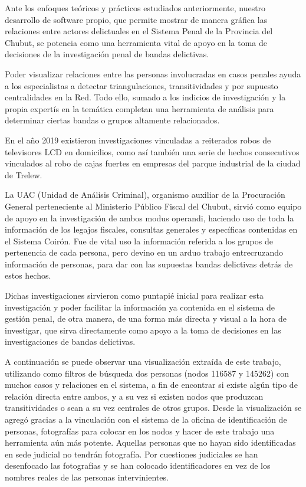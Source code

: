 Ante los enfoques teóricos y prácticos estudiados anteriormente, nuestro desarrollo de software propio, que permite mostrar de manera gráfica las relaciones entre actores delictuales en el Sistema Penal de la Provincia del Chubut, se potencia como una herramienta vital de apoyo en la toma de decisiones de la investigación penal de bandas delictivas.

Poder visualizar relaciones entre las personas involucradas en casos penales ayuda a los especialistas a detectar triangulaciones, transitividades y por supuesto centralidades en la Red. Todo ello, sumado a los indicios de investigación y la propia expertís en la temática completan una herramienta de análisis para determinar ciertas bandas o grupos altamente relacionados.

En el año 2019 existieron investigaciones vinculadas a reiterados robos de televisores LCD en domicilios, como así también una serie de hechos consecutivos vinculados al robo de cajas fuertes en empresas del parque industrial de la ciudad de Trelew.

La UAC (Unidad de Análisis Criminal), organismo auxiliar de la Procuración General perteneciente al Ministerio Público Fiscal del Chubut, sirvió como equipo de apoyo en la investigación de ambos modus operandi, haciendo uso de toda la información de los legajos fiscales, consultas generales y específicas contenidas en el Sistema Coirón. Fue de vital uso la información referida a los grupos de pertenencia de cada persona, pero devino en un arduo trabajo entrecruzando información de personas, para dar con las supuestas bandas delictivas detrás de estos hechos.

Dichas investigaciones sirvieron como puntapié inicial para realizar esta investigación y poder facilitar la información ya contenida en el sistema de gestión penal, de otra manera, de una forma más directa y visual a la hora de investigar, que sirva directamente como apoyo a la toma de decisiones en las investigaciones de bandas delictivas. 

A continuación se puede observar una visualización extraída de este trabajo, utilizando como filtros de búsqueda dos personas (nodos 116587 y 145262) con muchos casos y relaciones en el sistema, a fin de encontrar si existe algún tipo de relación directa entre ambos, y a su vez si existen nodos que produzcan transitividades o sean a su vez centrales de otros grupos.
Desde la visualización se agregó gracias a la vinculación con el sistema de la oficina de identificación de personas, fotografías para colocar en los nodos y hacer de este trabajo una herramienta aún más potente. Aquellas personas que no hayan sido identificadas en sede judicial no tendrán fotografía. Por cuestiones judiciales se han desenfocado las fotografías y se han colocado identificadores en vez de los nombres reales de las personas intervinientes.

